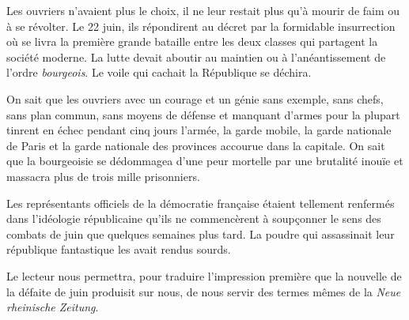 \documentclass[french,twoside]{book} %
\begin{document}
Les ouvriers n’avaient plus le choix, il ne leur restait plus qu’à mourir de faim ou à se révolter. Le 22 juin, ils répondirent au décret par la formidable insurrection où se livra la première grande bataille entre les deux classes qui partagent la société moderne. La lutte devait aboutir au maintien ou à l’anéantissement de l’ordre \emph{bourgeois}. Le voile qui cachait la République se déchira.\par
On sait que les ouvriers avec un courage et un génie sans exemple, sans chefs, sans plan commun, sans moyens de défense et manquant d’armes pour la plupart tinrent en échec pendant cinq jours l’armée, la garde mobile, la garde nationale de Paris et la garde nationale des provinces accourue dans la capitale. On sait que la bourgeoisie se dédommagea d’une peur mortelle par une brutalité inouïe et massacra plus de trois mille prisonniers.\par
Les représentants officiels de la démocratie française étaient tellement renfermés dans l’idéologie républicaine qu’ils ne commencèrent à soupçonner le sens des combats de juin que quelques semaines plus tard. La poudre qui assassinait leur république fantastique les avait rendus sourds.\par
Le lecteur nous permettra, pour traduire l’impression première que la nouvelle de la défaite de juin produisit sur nous, de nous servir des termes mêmes de la \emph{Neue rheinische Zeitung}.\par
\end{document}
